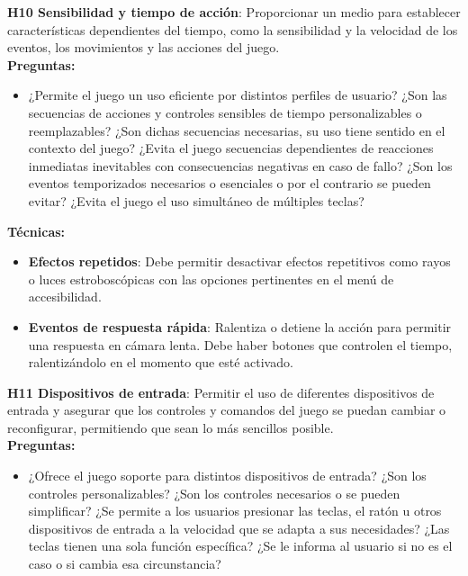  \textbf{H10 Sensibilidad y tiempo de acción}: Proporcionar un medio para establecer características dependientes del tiempo, como la sensibilidad y la velocidad de los eventos, los movimientos y las acciones del juego. \cite{deborbacamposUsabilityAccessibilityGameplay2016} \cite{deborbacamposUsabilityAccessibilityGameplay2016} \cite{WebContentAccessibility} \cite{teixeiraborgesFairPlayGuidelines2018a}\\
 \textbf{Preguntas:}
 \begin{itemize}
 	\item ¿Permite el juego un uso eficiente por distintos perfiles de usuario? ¿Son las secuencias de acciones y controles sensibles de tiempo personalizables o reemplazables? ¿Son dichas secuencias necesarias, su uso tiene sentido en el contexto del juego? ¿Evita el juego secuencias dependientes de reacciones inmediatas inevitables con consecuencias negativas en caso de fallo? ¿Son los eventos temporizados necesarios o esenciales o por el contrario se pueden evitar? ¿Evita el juego el uso simultáneo de múltiples teclas?
 \end{itemize}
 \textbf{Técnicas:}
 \begin{itemize}
 	\item \textbf{Efectos repetidos}: Debe permitir desactivar efectos repetitivos como rayos o luces estroboscópicas con las opciones pertinentes en el menú de accesibilidad. \cite{WebContentAccessibility} \cite{LibroBlancoAccesibilidad}
 	\item \textbf{Eventos de respuesta rápida}: Ralentiza o detiene la acción para permitir una respuesta en cámara lenta. Debe haber botones que controlen el tiempo, ralentizándolo en el momento que esté activado. \cite{LibroBlancoAccesibilidad} 
 \end{itemize}
  \textbf{H11 Dispositivos de entrada}: Permitir el uso de diferentes dispositivos de entrada y asegurar que los controles y comandos del juego se puedan cambiar o reconfigurar, permitiendo que sean lo más sencillos posible. \cite{teixeiraborgesImBlindCan2017}  \cite{deborbacamposUsabilityAccessibilityGameplay2016} \cite{jimenezhurtadoDimensionsSubdimensionsEQUIT2025} \cite{teixeiraborgesFairPlayGuidelines2018a}\\
\textbf{Preguntas:}
\begin{itemize}
	\item ¿Ofrece el juego soporte para distintos dispositivos de entrada? ¿Son los controles personalizables? ¿Son los controles necesarios o se pueden simplificar? ¿Se permite a los usuarios presionar las teclas, el ratón u otros dispositivos de entrada a la velocidad que se adapta a sus necesidades? ¿Las teclas tienen una sola función específica? ¿Se le informa al usuario si no es el caso o si cambia esa circunstancia?
\end{itemize}
